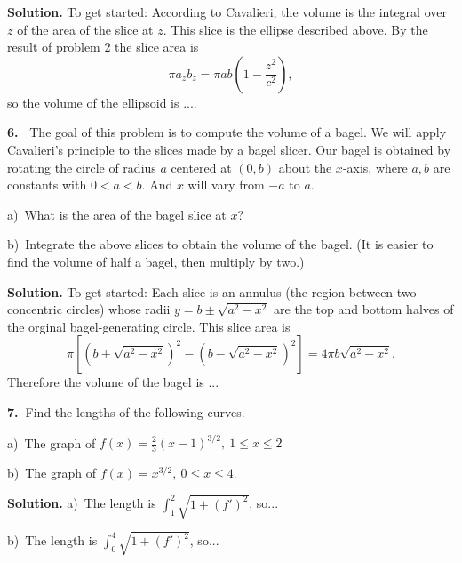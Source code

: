 \documentclass[12pt]{article}
\theoremstyle{definition}
\theoremstyle{remark}
\theoremstyle{definition}
\newenvironment{Solution}{\noindent\textbf{Solution.}}{}
\begin{document}
\begin{Solution} 
To get started: 
According to Cavalieri, the volume is the integral over $z$ of the area of the slice at $z$. This slice is the ellipse described above. By the result of problem 2 the slice area is 
\[\pi a_z b_z=\pi a b\left(1-\frac{z^2}{c^2}\right),\]
so the volume of the ellipsoid is ....

\end{Solution} 

{\bf 6.\ } The goal of this problem is to compute the volume of a bagel. We will  apply Cavalieri's principle to the slices made by a bagel slicer. Our bagel is obtained by rotating the circle of radius $a$ centered at $(0,b)$ about the $x$-axis, where $a,b$ are constants with $0<a<b$. And $x$ will vary from $-a$ to $a$. 

a)\ What is the area of the bagel slice at $x$? 

b)\ Integrate the above slices to obtain the volume of the bagel. 
(It is easier to find the volume of half a bagel, then multiply by two.)

\begin{Solution} To get started: Each slice is an annulus (the region between two concentric circles)
whose radii $y=b\pm\sqrt{a^2-x^2}$ are the top and bottom halves of the orginal bagel-generating circle.  This slice area is 
\[
\pi\left[(b+\sqrt{a^2-x^2})^2-(b-\sqrt{a^2-x^2})^2\right]=
4\pi b\sqrt{a^2-x^2}.
\]
Therefore the volume of the bagel is ...
\end{Solution}

{\bf 7.\ }Find the lengths of the following curves.  

a)\ The graph of $f(x)=\frac{2}{3}(x-1)^{3/2},\ 1\leq x\leq 2$

b)\  The graph of $f(x)=x^{3/2},\ 0\leq x\leq 4$.



\begin{Solution} a)\ The length is $\int_1^2 \sqrt{1+(f')^2}$, so...

b)\ The length is $\int_0^4\sqrt{1+(f')^2}$, so...

\end{Solution}
\end{document}
